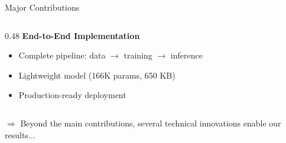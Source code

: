 \documentclass[aspectratio=169]{beamer}
\begin{document}
\begin{frame}{Major Contributions}
\begin{columns}
\begin{column}{0.48\textwidth}
            \textbf{End-to-End Implementation}
            \begin{itemize}
                \item Complete pipeline: data $\to$ training $\to$ inference
                \item Lightweight model (166K params, 650 KB)
                \item Production-ready deployment
            \end{itemize}
        \end{column}
    \end{columns}
    
    \vspace{0.2cm}
    \small \textcolor{iiitblue}{$\Rightarrow$ Beyond the main contributions, several technical innovations enable our results...}
\end{frame}
\end{document}
